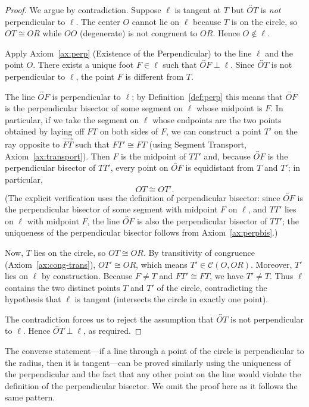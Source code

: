 \documentclass[12pt]{article}
\newcommand{\ray}[1]{\overrightarrow{#1}}
\newcommand{\congsegment}{\cong}
\begin{document}
\begin{proof}
We argue by contradiction. Suppose $\ell$ is tangent at $T$ but $\overleftrightarrow{OT}$ is \emph{not} perpendicular to $\ell$. The center $O$ cannot lie on $\ell$ because $T$ is on the circle, so $OT\congsegment OR$ while $OO$ (degenerate) is not congruent to $OR$. Hence $O\notin\ell$.

Apply Axiom~\ref{ax:perp} (Existence of the Perpendicular) to the line $\ell$ and the point $O$. There exists a unique foot $F\in\ell$ such that $\overleftrightarrow{OF}\perp\ell$. Since $\overleftrightarrow{OT}$ is not perpendicular to $\ell$, the point $F$ is different from $T$.

The line $\overleftrightarrow{OF}$ is perpendicular to $\ell$; by Definition~\ref{def:perp} this means that $\overleftrightarrow{OF}$ is the perpendicular bisector of some segment on $\ell$ whose midpoint is $F$. In particular, if we take the segment on $\ell$ whose endpoints are the two points obtained by laying off $FT$ on both sides of $F$, we can construct a point $T'$ on the ray opposite to $\ray{FT}$ such that $FT'\congsegment FT$ (using Segment Transport, Axiom~\ref{ax:transport}). Then $F$ is the midpoint of $TT'$ and, because $\overleftrightarrow{OF}$ is the perpendicular bisector of $TT'$, every point on $\overleftrightarrow{OF}$ is equidistant from $T$ and $T'$; in particular,
\[
OT \congsegment OT'.
\]
(The explicit verification uses the definition of perpendicular bisector: since $\overleftrightarrow{OF}$ is the perpendicular bisector of some segment with midpoint $F$ on $\ell$, and $TT'$ lies on $\ell$ with midpoint $F$, the line $\overleftrightarrow{OF}$ is also the perpendicular bisector of $TT'$; the uniqueness of the perpendicular bisector follows from Axiom~\ref{ax:perpbis}.)

Now, $T$ lies on the circle, so $OT\congsegment OR$. By transitivity of congruence (Axiom~\ref{ax:cong-trans}), $OT'\congsegment OR$, which means $T'\in\mathcal{C}(O,OR)$. Moreover, $T'$ lies on $\ell$ by construction. Because $F\neq T$ and $FT'\congsegment FT$, we have $T'\neq T$. Thus $\ell$ contains the two distinct points $T$ and $T'$ of the circle, contradicting the hypothesis that $\ell$ is tangent (intersects the circle in exactly one point).

The contradiction forces us to reject the assumption that $\overleftrightarrow{OT}$ is not perpendicular to $\ell$. Hence $\overleftrightarrow{OT}\perp\ell$, as required.
\end{proof}

The converse statement---if a line through a point of the circle is perpendicular to the radius, then it is tangent---can be proved similarly using the uniqueness of the perpendicular and the fact that any other point on the line would violate the definition of the perpendicular bisector. We omit the proof here as it follows the same pattern.
\end{document}
